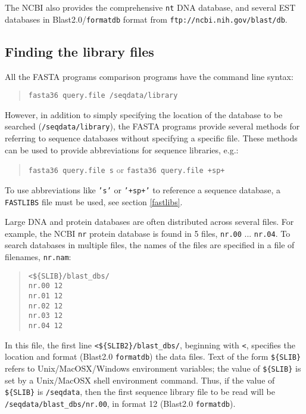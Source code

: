\documentclass[11pt]{article}
\begin{document}
The NCBI also provides the comprehensive \texttt{nt} DNA database, and
several EST databases in Blast2.0/\texttt{formatdb} format from
\texttt{ftp://ncbi.nih.gov/blast/db}.


\subsection{Finding the library files}

All the FASTA programs comparison programs have the command line syntax:
\begin{quote}
\texttt{fasta36 query.file /seqdata/library}
\end{quote}
However, in addition to simply specifying the location of the database
to be searched
(\texttt{/seqdata/library}), the FASTA programs
provide several methods for referring to sequence databases without specifying a specific file.  These methods can be used to provide abbreviations for sequence libraries, e.g.:
\begin{quote}
\texttt{fasta36 query.file s} 
or
\texttt{fasta36 query.file +sp+}
\end{quote}
To use abbreviations like \texttt{'s'} or \texttt{'+sp+'} to reference a
sequence database, a \texttt{FASTLIBS} file must be used, see section
\ref{fastlibs}.

Large DNA and protein databases are often distributed across several
files.  For example, the NCBI \texttt{nr} protein database is found in
5 files, \texttt{nr.00} ... \texttt{nr.04}.  To search databases in
multiple files, the names of the files are specified in a file of
filenames, \texttt{nr.nam}:
\begin{quote}
\begin{verbatim}
<${SLIB}/blast_dbs/
nr.00 12
nr.01 12
nr.02 12
nr.03 12
nr.04 12
\end{verbatim}
\end{quote}
In this file, the first line \texttt{<\$\{SLIB2\}/blast\_dbs/},
beginning with \texttt{<}, specifies the location and format (Blast2.0
\texttt{formatdb}) the data files. Text of the form
\texttt{\$\{SLIB\}} refers to Unix/MacOSX/Windows environment
variables; the value of \texttt{\$\{SLIB\}} is set by a Unix/MacOSX
shell environment command. Thus, if the value of \texttt{\$\{SLIB\}}
is \texttt{/seqdata}, then the first sequence library file to be read
will be \texttt{/seqdata/blast\_dbs/nr.00}, in format 12 (Blast2.0
\texttt{formatdb}).
\end{document}
